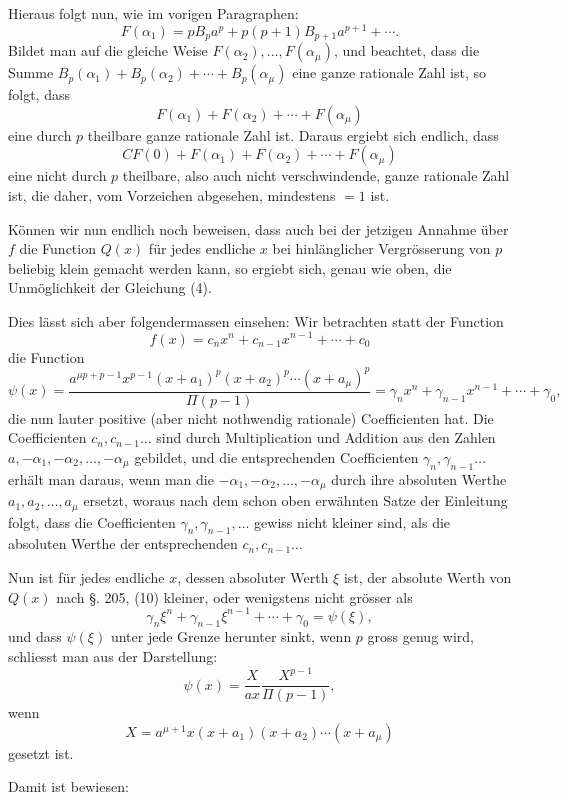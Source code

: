 \documentclass[11pt]{article}
\begin{document}
Hieraus folgt nun, wie im vorigen Paragraphen:
\[
F(\alpha_1)=pB_pa^p+p(p+1)B_{p+1}a^{p+1}+\cdots.
\]
Bildet man auf die gleiche Weise $F(\alpha_2),\ldots,F(\alpha_\mu)$, und beachtet, dass die Summe $B_p(\alpha_1)+B_p(\alpha_2)+\cdots+B_p(\alpha_\mu)$ eine ganze rationale Zahl ist, so folgt, dass
\[
F(\alpha_1)+F(\alpha_2)+\cdots+F(\alpha_\mu)
\]
eine durch $p$ theilbare ganze rationale Zahl ist. Daraus ergiebt sich endlich, dass
\[
CF(0)+F(\alpha_1)+F(\alpha_2)+\cdots+F(\alpha_\mu)
\]
eine nicht durch $p$ theilbare, also auch nicht verschwindende, ganze rationale Zahl ist, die daher, vom Vorzeichen abgesehen, mindestens $=1$ ist.

Können wir nun endlich noch beweisen, dass auch bei der jetzigen Annahme über $f$ die Function $Q(x)$ für jedes endliche $x$ bei hinlänglicher Vergrösserung von $p$ beliebig klein gemacht werden kann, so ergiebt sich, genau wie oben, die Unmöglichkeit der Gleichung (4).

Dies lässt sich aber folgendermassen einsehen: Wir betrachten statt der Function
\begin{equation}\tag{6}
f(x)=c_nx^n+c_{n-1}x^{n-1}+\cdots+c_0
\end{equation}
die Function
\[
\psi(x)=
\frac{a^{\mu p+p-1}x^{p-1}(x+a_1)^p(x+a_2)^p\cdots(x+a_\mu)^p}{\Pi(p-1)}
=\gamma_nx^n+\gamma_{n-1}x^{n-1}+\cdots+\gamma_0,
\]
die nun lauter positive (aber nicht nothwendig rationale) Coefficienten hat. Die Coefficienten $c_n,c_{n-1}\ldots$ sind durch Multiplication und Addition aus den Zahlen $a,-\alpha_1,-\alpha_2,\ldots,-\alpha_\mu$ gebildet, und die entsprechenden Coefficienten $\gamma_n,\gamma_{n-1}\ldots$ erhält man daraus, wenn man die $-\alpha_1,-\alpha_2,\ldots,-\alpha_\mu$ durch ihre absoluten Werthe $a_1,a_2,\ldots,a_\mu$ ersetzt, woraus nach dem schon oben erwähnten Satze der Einleitung folgt, dass die Coefficienten $\gamma_n,\gamma_{n-1},\ldots$ gewiss nicht kleiner sind, als die absoluten Werthe der entsprechenden $c_n,c_{n-1}\ldots$

Nun ist für jedes endliche $x$, dessen absoluter Werth $\xi$ ist, der absolute Werth von $Q(x)$ nach §. 205, (10) kleiner, oder wenigstens nicht grösser als
\[
\gamma_n\xi^n+\gamma_{n-1}\xi^{n-1}+\cdots+\gamma_0=\psi(\xi),
\]
und dass $\psi(\xi)$ unter jede Grenze herunter sinkt, wenn $p$ gross genug wird, schliesst man aus der Darstellung:
\[
\psi(x)=\frac{X}{ax}\frac{X^{p-1}}{\Pi(p-1)},
\]
wenn
\[
X=a^{\mu+1}x(x+a_1)(x+a_2)\cdots(x+a_\mu)
\]
gesetzt ist.

Damit ist bewiesen:
\end{document}
